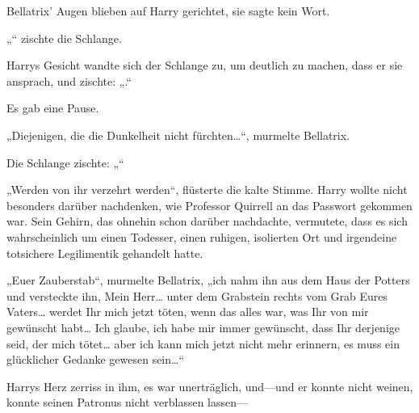 Bellatrix' Augen blieben auf Harry gerichtet, sie sagte kein Wort.

„“ zischte die Schlange.

Harrys Gesicht wandte sich der Schlange zu, um deutlich zu machen, dass er sie ansprach, und zischte: „.“

Es gab eine Pause.

„Diejenigen, die die Dunkelheit nicht fürchten…“, murmelte Bellatrix.

Die Schlange zischte: „“

„Werden von ihr verzehrt werden“, flüsterte die kalte Stimme. Harry wollte nicht besonders darüber nachdenken, wie Professor Quirrell an das Passwort gekommen war. Sein Gehirn, das ohnehin schon darüber nachdachte, vermutete, dass es sich wahrscheinlich um einen Todesser, einen ruhigen, isolierten Ort und irgendeine totsichere Legilimentik gehandelt hatte.

„Euer Zauberstab“, murmelte Bellatrix, „ich nahm ihn aus dem Haus der Potters und versteckte ihn, Mein Herr… unter dem Grabstein rechts vom Grab Eures Vaters… werdet Ihr mich jetzt töten, wenn das alles war, was Ihr von mir gewünscht habt… Ich glaube, ich habe mir immer gewünscht, dass Ihr derjenige seid, der mich tötet… aber ich kann mich jetzt nicht mehr erinnern, es muss ein glücklicher Gedanke gewesen sein…“

Harrys Herz zerriss in ihm, es war unerträglich, und—und er konnte nicht weinen, konnte seinen Patronus nicht verblassen lassen—

